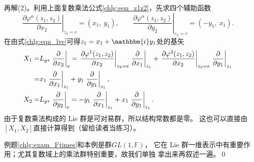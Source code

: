 再解(2)。利用上面复数乘法公式\eqref{chlg:eqn_z1z2}，先求四个辅助函数
\begin{equation}
    \left. \frac{\partial \varphi^\alpha (z_1,z_2)}{\partial x_2} \right|_{z_2=e} = (x_1,\ y_1) ,\qquad
    \left. \frac{\partial \varphi^\alpha (z_1,z_2)}{\partial y_2} \right|_{z_2=e} = (-y_1,\ x_1) .
\end{equation}
在由式\eqref{chlg:eqn_lve}可得$z_1=x_1+\mathbbm{i} y_1$处的基矢
\begin{align}
    X_1=&L_{g*} \left.\frac{\partial }{\partial x_2}\right|_{e} = 
    \left. \frac{\partial \varphi^1 (z_1,z_2)}{\partial x_2} 
    \right|_{z_2=e}   \left. \frac{\partial}{\partial x_1}\right|_{z_1} +
    \left. \frac{\partial \varphi^2 (z_1,z_2)}{\partial x_2} 
    \right|_{z_2=e}   \left. \frac{\partial}{\partial y_1}\right|_{z_1} \notag \\
    =& x_1\left. \frac{\partial}{\partial x_1}\right|_{z_1}+ y_1\left. \frac{\partial}{\partial y_1}\right|_{z_1}, \\
    X_2=&L_{g*} \left.\frac{\partial }{\partial y_2} \right|_{e}= 
       -y_1\left. \frac{\partial}{\partial x_1}\right|_{z_1}+ x_1\left. \frac{\partial}{\partial y_1}\right|_{z_1} .
\end{align}
由于复数乘法构成的 Lie 群是可对易群，所以结构常数都是零。
这也可以直接由$[X_1,X_2]$直接计算得到（留给读者当练习）。

例题\ref{chlg:exam_Ftimes}和本例是群$GL(1,\mathbb{F})$，
它在 Lie 群一维表示中有重要作用；尤其复数域上的乘法群特别重要，故我们单独
拿出来再叙述一遍。\qed

